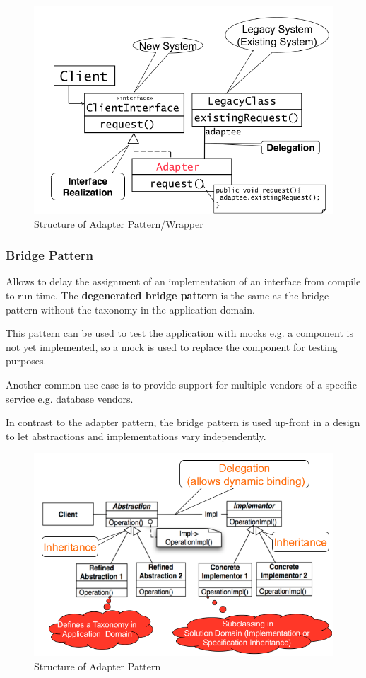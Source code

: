 \begin{figure}[h]
	\centering
	\includegraphics[width=\linewidth]{images/pattern_adapter.png}
	\caption{Structure of Adapter Pattern/Wrapper}
\end{figure}
\newpage

\subsubsection{Bridge Pattern}
Allows to delay the assignment of an implementation of an interface from compile to run time.
The \textbf{degenerated bridge pattern} is the same as the bridge pattern without the taxonomy in the application domain.

This pattern can be used to test the application with mocks e.g. a component is not yet implemented, so a mock is used to replace the component for testing purposes.

Another common use case is to provide support for multiple vendors of a specific service e.g. database vendors.

In contrast to the adapter pattern, the bridge pattern is used up-front in a design to let abstractions and implementations vary independently. 
\begin{figure}[h]
	\centering
	\includegraphics[width=\linewidth]{images/pattern_bridge.png}
	\caption{Structure of Adapter Pattern}
\end{figure}
\newpage

